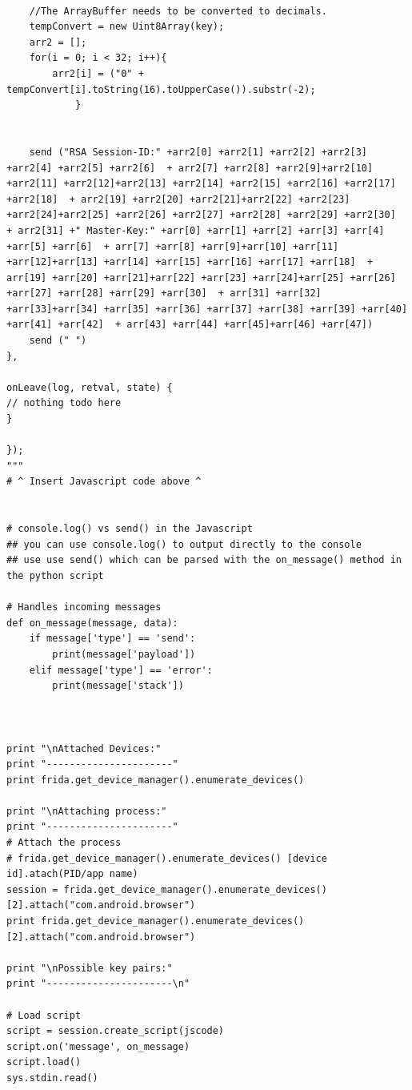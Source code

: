\documentclass[12pt, a4paper]{report}
\begin{document}
\begin{appendices}
\begin{lstlisting}[frame=single, breaklines=true]
 
	//The ArrayBuffer needs to be converted to decimals. 
	tempConvert = new Uint8Array(key);
	arr2 = [];
	for(i = 0; i < 32; i++){
		arr2[i] = ("0" + tempConvert[i].toString(16).toUpperCase()).substr(-2);
			}
 
 
	send ("RSA Session-ID:" +arr2[0] +arr2[1] +arr2[2] +arr2[3] +arr2[4] +arr2[5] +arr2[6]  + arr2[7] +arr2[8] +arr2[9]+arr2[10] +arr2[11] +arr2[12]+arr2[13] +arr2[14] +arr2[15] +arr2[16] +arr2[17] +arr2[18]  + arr2[19] +arr2[20] +arr2[21]+arr2[22] +arr2[23] +arr2[24]+arr2[25] +arr2[26] +arr2[27] +arr2[28] +arr2[29] +arr2[30]  + arr2[31] +" Master-Key:" +arr[0] +arr[1] +arr[2] +arr[3] +arr[4] +arr[5] +arr[6]  + arr[7] +arr[8] +arr[9]+arr[10] +arr[11] +arr[12]+arr[13] +arr[14] +arr[15] +arr[16] +arr[17] +arr[18]  + arr[19] +arr[20] +arr[21]+arr[22] +arr[23] +arr[24]+arr[25] +arr[26] +arr[27] +arr[28] +arr[29] +arr[30]  + arr[31] +arr[32] +arr[33]+arr[34] +arr[35] +arr[36] +arr[37] +arr[38] +arr[39] +arr[40] +arr[41] +arr[42]  + arr[43] +arr[44] +arr[45]+arr[46] +arr[47])
	send (" ")
},
 
onLeave(log, retval, state) {
// nothing todo here
}
 
});
"""
# ^ Insert Javascript code above ^
 
 
# console.log() vs send() in the Javascript
## you can use console.log() to output directly to the console
## use use send() which can be parsed with the on_message() method in the python script 
 
# Handles incoming messages
def on_message(message, data):
    if message['type'] == 'send':
        print(message['payload'])
    elif message['type'] == 'error':
        print(message['stack'])
 
 
 
print "\nAttached Devices:"
print "----------------------"
print frida.get_device_manager().enumerate_devices()
 
print "\nAttaching process:"
print "----------------------"
# Attach the process
# frida.get_device_manager().enumerate_devices() [device id].atach(PID/app name)
session = frida.get_device_manager().enumerate_devices() [2].attach("com.android.browser")
print frida.get_device_manager().enumerate_devices() [2].attach("com.android.browser")
 
print "\nPossible key pairs:"
print "----------------------\n"
 
# Load script
script = session.create_script(jscode)
script.on('message', on_message)
script.load()
sys.stdin.read()
 
 
 

\end{lstlisting}
\end{appendices}
\end{document}
